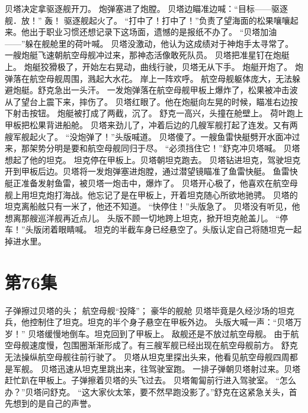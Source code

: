 \documentclass[a4paper,12pt,UTF8,twoside]{ctexbook}
\begin{document}
        贝塔决定拿驱逐舰开刀。 
        炮弹塞进了炮膛。 
        贝塔边瞄准边喊：“目标——驱逐舰．放！” 
        轰！ 
        驱逐舰起火了。 
        “打中了！打中了！”负责了望海面的松果嚷嚷起来。他出于职业习惯还想记录下这场面，遗憾的是报纸不办了。 
        “贝塔加油——”躲在舰舱里的荷叶喊。 
        贝塔没激动，他认为这成绩对于神炮手太寻常了。 
        一艘炮艇飞速朝航空母舰冲过来，那神态活像敢死队员。 
        贝塔把准星钉在炮艇上。 
        炮艇狡猾极了，开始左右晃动，曲线行驶，贝塔无从下手。 
        炮艇开炮了。 
        炮弹落在航空母舰周围，溅起大水花。 
        岸上一阵欢呼。 
        航空母舰躯体庞大，无法躲避炮艇。舒克急出一头汗。 
        一发炮弹落在航空母舰甲板上爆炸了，松果被冲击波从了望台上震下来，摔伤了。 
        贝塔红眼了。他在炮艇向左晃的时候，瞄准右边按下射击按钮。 
        炮艇被打成了两截，沉了。 
        舒克一高兴，头撞在舱壁上。 
        荷叶跑上甲板把松果背进船舱。 
        贝塔来劲儿了，冲着后边的几艘军舰打起了连发。又有两艘军舰起火了。 
        “没炮弹了！”头版喊道。 
        贝塔傻了。一艘鱼雷快艇劈开水面冲过来，那架势分明是要和航空母舰同归于尽。 
        “必须挡住它！”舒克冲贝塔喊。 
        贝塔想起了他的坦克。 
        坦克停在甲板上。贝塔朝坦克跑去。 
        贝塔钻进坦克，驾驶坦克开到甲板后边。贝塔将一发炮弹塞进炮膛，通过潜望镜瞄准了鱼雷快艇。 
        鱼雷快艇正准备发射鱼雷，被贝塔一炮击中，爆炸了。 
        贝塔开心极了，他喜欢在航空母舰上用坦克炮打海战。他忘记了是在甲板上，开着坦克随心所欲地驰骋。 
        贝塔的坦克离船舷只有一米了，他还不知道。 
        “快停住！”头版急了。 
        贝塔没有听见，他想离那艘巡洋舰再近点儿。 
        头版不顾一切地跨上坦克，掀开坦克舱盖儿。 
        “停车！”头版闭着眼睛喊。 
        坦克的半截车身已经悬空了。头版认定自己将随坦克一起掉进水里。   \chapter{第76集} 
        子弹擦过贝塔的头； 
        航空母舰“投降”； 
        豪华的舰舱   
        贝塔毕竟是久经沙场的坦克兵，他控制住了坦克。坦克的半个身子悬空在甲板外边。 
        头版大喊一声：“贝塔万岁！” 
        贝塔缓慢地倒车。坦克回到了甲板上。 
        敌舰还是不放过航空母舰。 
        由于航空母舰速度慢，包围圈渐渐形成了。有三艘军舰已经出现在航空母舰前方。 
        舒克无法操纵航空母舰往前行驶了。 
        贝塔从坦克里探出头来，他看见航空母舰四周都是军舰。 
        贝塔迅速从坦克里跳出来，往驾驶室跑。 
        一排子弹朝贝塔射过来。贝塔赶忙趴在甲板上。子弹擦着贝塔的头飞过去。 
        贝塔匍匐前行进入驾驶室。 
        “怎么办？”贝塔问舒克。 
        “这大家伙太笨，要不然早跑没影了。”舒克在这紧急关头，首先想到的是自己的声誉。 
\end{document}
